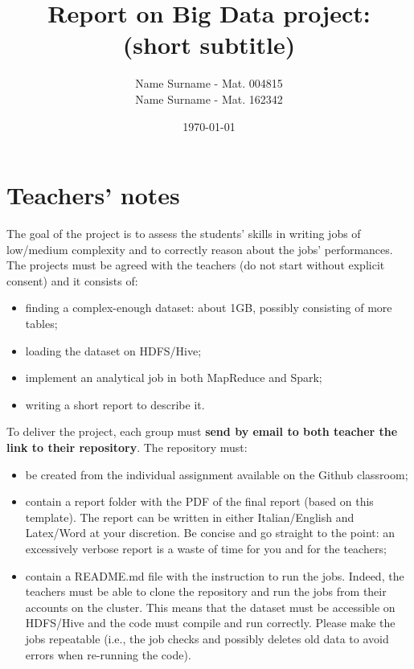 \documentclass[10pt]{article}
\title{\textbf{Report on Big Data project: \\(short subtitle)}}
\author{
	Name Surname - Mat. 004815\\
	Name Surname - Mat. 162342}
\date{\today}
\begin{document}
\maketitle
\newpage

\tableofcontents

\newpage

\section{Teachers' notes}

The goal of the project is to assess the students' skills in writing jobs of low/medium complexity and to correctly reason about the jobs' performances. The projects must be agreed with the teachers (do not start without explicit consent) and it consists of:

\begin{itemize}
\item finding a complex-enough dataset: about 1GB, possibly consisting of more tables;
\item loading the dataset on HDFS/Hive;
\item implement an analytical job in both MapReduce and Spark;
\item writing a short report to describe it.
\end{itemize}

To deliver the project, each group must {\bf send by email to both teacher the link to their repository}. The repository must:
\begin{itemize}
\item be created from the individual assignment available on the Github classroom;
\item contain a {\sf report} folder with the PDF of the final report (based on this template). The report can be written in either Italian/English and Latex/Word at your discretion. Be concise and go straight to the point: an excessively verbose report is a waste of time for you and for the teachers;
\item contain a {\sf README.md} file with the instruction to run the jobs. Indeed, the teachers must be able to clone the repository and run the jobs from their accounts on the cluster. This means that the dataset must be accessible on HDFS/Hive and the code must compile and run correctly. Please make the jobs repeatable (i.e., the job checks and possibly deletes old data to avoid errors when re-running the code).
\end{itemize}
\end{document}

